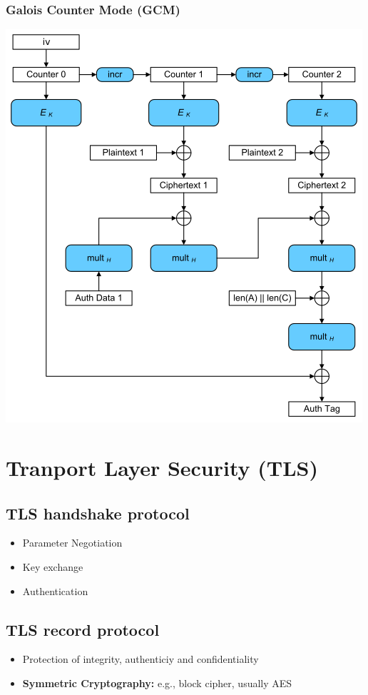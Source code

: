 \subsubsection{Galois Counter Mode (GCM)}
\begin{center}
  \includegraphics[width=0.5\columnwidth]{Resources/GCM-Galois_Counter_Mode_with_IV.svg.png}
\end{center}

\section{Tranport Layer Security (TLS)}
\subsection{TLS handshake protocol}
\begin{itemize}
  \item Parameter Negotiation
  \item Key exchange
  \item Authentication
\end{itemize}
\subsection{TLS record protocol}
\begin{itemize}
  \item Protection of integrity, authenticiy and confidentiality
  \item \textbf{Symmetric Cryptography:} e.g., block cipher, usually AES
\end{itemize}
